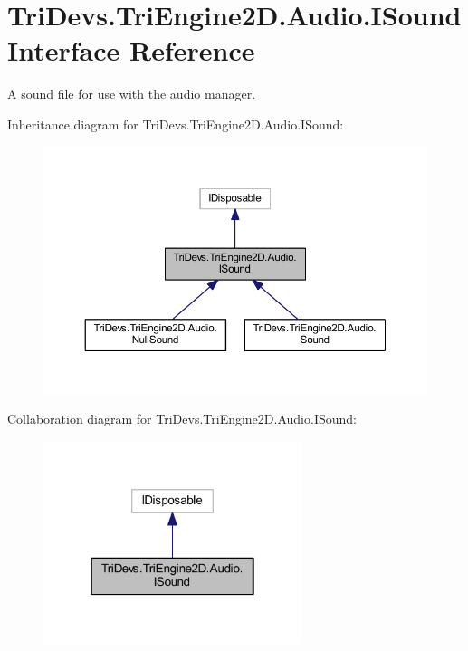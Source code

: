 \hypertarget{interface_tri_devs_1_1_tri_engine2_d_1_1_audio_1_1_i_sound}{\section{Tri\-Devs.\-Tri\-Engine2\-D.\-Audio.\-I\-Sound Interface Reference}
\label{interface_tri_devs_1_1_tri_engine2_d_1_1_audio_1_1_i_sound}
}


A sound file for use with the audio manager.  




Inheritance diagram for Tri\-Devs.\-Tri\-Engine2\-D.\-Audio.\-I\-Sound\-:\nopagebreak
\begin{figure}[H]
\begin{center}
\leavevmode
\includegraphics[width=350pt]{interface_tri_devs_1_1_tri_engine2_d_1_1_audio_1_1_i_sound__inherit__graph}
\end{center}
\end{figure}


Collaboration diagram for Tri\-Devs.\-Tri\-Engine2\-D.\-Audio.\-I\-Sound\-:\nopagebreak
\begin{figure}[H]
\begin{center}
\leavevmode
\includegraphics[width=214pt]{interface_tri_devs_1_1_tri_engine2_d_1_1_audio_1_1_i_sound__coll__graph}
\end{center}
\end{figure}
